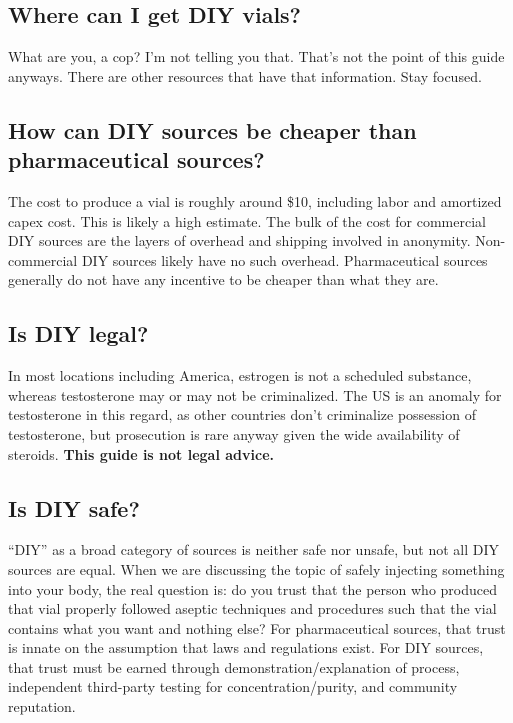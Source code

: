 \documentclass{article}
\begin{document}
{{\subsection{Where can I get DIY vials?}

What are you, a cop? I’m not telling you that. That’s not the point of this guide anyways. There are other resources that have that information. Stay focused.

\subsection{How can DIY sources be cheaper than pharmaceutical sources?}

The cost to produce a vial is roughly around \$10, including labor and amortized capex cost. This is likely a high estimate. The bulk of the cost for commercial DIY sources are the layers of overhead and shipping involved in anonymity. Non-commercial DIY sources likely have no such overhead. Pharmaceutical sources generally do not have any incentive to be cheaper than what they are. 

\subsection{Is DIY legal?}\label{6-11}

In most locations including America, estrogen is not a scheduled substance, whereas testosterone may or may not be criminalized. The US is an anomaly for testosterone in this regard, as other countries don’t criminalize possession of testosterone, but prosecution is rare anyway given the wide availability of steroids. \textbf{This guide is not legal advice.}

\subsection{Is DIY safe?}

“DIY” as a broad category of sources is neither safe nor unsafe, but not all DIY sources are equal. When we are discussing the topic of safely injecting something into your body, the real question is: do you trust that the person who produced that vial properly followed aseptic techniques and procedures such that the vial contains what you want and nothing else? For pharmaceutical sources, that trust is innate on the assumption that laws and regulations exist. For DIY sources, that trust must be earned through demonstration/explanation of process, independent third-party testing for concentration/purity, and community reputation.

}}
\end{document}
